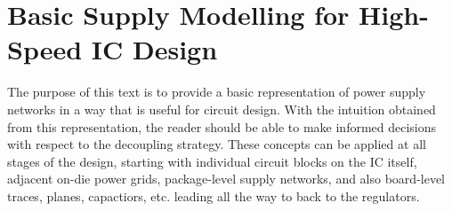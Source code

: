 %
\section{Basic Supply Modelling for High-Speed IC Design}
\par The purpose of this text is to provide a basic representation of power supply
networks in a way that is useful for circuit design.  With the intuition obtained
from this representation, the reader should be able to make informed decisions
with respect to the decoupling strategy. These concepts can be applied at all
stages of the design, starting with individual circuit blocks on the IC itself,
adjacent on-die power grids, package-level supply networks, and also board-level
traces, planes, capactiors, etc. leading all the way to back to the regulators.
%
